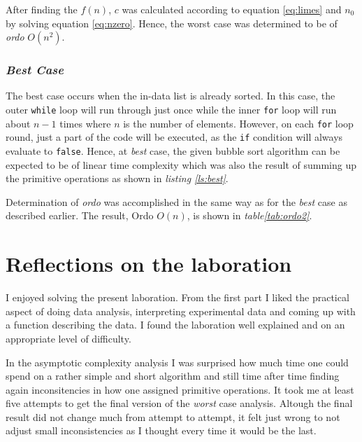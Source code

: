 \documentclass[a4paper,11pt,twoside]{article}
\begin{document}
After finding the $f(n)$,  $c$ was calculated according to equation 
\ref{eq:limes} and $n_{0}$ by solving equation \ref{eq:nzero}. Hence,
the worst case was determined to be of \emph{ordo} $O(n^2)$. 

\subsubsection{\emph{Best Case}}
The best case occurs when the in-data list is already sorted. In this
case, the outer \verb!while! loop will run through just once while the
inner \verb!for! loop will run about $n-1$ times where $n$ is the
number of elements. However, on each \verb!for! loop round, just a
part of the code will be executed, as the \verb!if! condition will
always evaluate to \verb!false!. Hence, at \emph{best} case, the given
bubble sort algorithm can be expected to be of linear time complexity 
which was also the result of summing up the primitive 
operations as shown in \textit{listing \ref{ls:best}}.  

Determination of \emph{ordo} was accomplished in the same way as for the
\emph{best} case as described earlier. The result, Ordo $O(n)$, is shown 
in \textit{table\ref{tab:ordo2}}.

\section{Reflections on the laboration}
I enjoyed solving the present laboration. From the first part I liked
the practical aspect of doing data analysis, interpreting experimental
data and coming up with a function describing the data. I found the 
laboration well explained and on an appropriate level of difficulty. 

In the asymptotic complexity analysis I was surprised how much time
one could spend on a rather simple and short algorithm and still time
after time finding again inconsitencies in how one assigned primitive
operations. It took me at least five attempts to get the final version
of the \emph{worst} case analysis. Altough the final result did not change
much from attempt to attempt, it felt just wrong to not adjust small
inconsistencies as I thought every time it would be the last.



\end{document}
